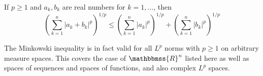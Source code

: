 \documentclass[12pt]{article}
\newcommand{\R}{\mathbbmss{R}}
\begin{document}
If $p \geq 1$ and $a_k, b_k$ are real numbers for $k = 1,\ldots$, then
$$\left( \sum_{k=1}^n |a_k+b_k|^p\right)^{1/p} \le \left(\sum_{k=1}^n |a_k|^p\right)^{1/p} + \left(\sum_{k=1}^n |b_k|^p\right)^{1/p}$$

The Minkowski inequality is in fact valid for all $L^p$ norms with $p\ge1$ on arbitrary measure spaces. This covers the case of $\R^n$ listed here as well as spaces of sequences and spaces of functions, and also complex $L^p$ spaces.
\end{document}
